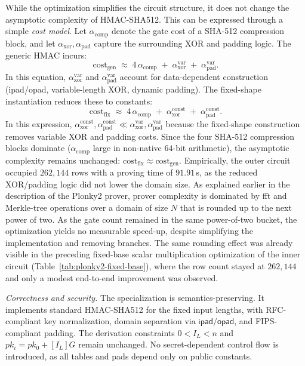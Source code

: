 While the optimization simplifies the circuit structure, it does not change the asymptotic complexity of HMAC-SHA512. This can be expressed through a simple \emph{cost model}. Let $\alpha_{\mathrm{comp}}$ denote the gate cost of a SHA-512 compression block, and let $\alpha_{\mathrm{xor}}, \alpha_{\mathrm{pad}}$ capture the surrounding XOR and padding logic. The generic HMAC incurs:
\[
\mathrm{cost}_{\mathrm{gen}} \;\approx\; 4\,\alpha_{\mathrm{comp}} \;+\; \alpha_{\mathrm{xor}}^{\mathrm{var}} \;+\; \alpha_{\mathrm{pad}}^{\mathrm{var}}.
\]
In this equation, $\alpha_{\mathrm{xor}}^{\mathrm{var}}$ and $\alpha_{\mathrm{pad}}^{\mathrm{var}}$ account for data-dependent construction (ipad/opad, variable-length XOR, dynamic padding). The fixed-shape instantiation reduces these to constants:
\[
\mathrm{cost}_{\mathrm{fix}} \;\approx\; 4\,\alpha_{\mathrm{comp}} \;+\; \alpha_{\mathrm{xor}}^{\mathrm{const}} \;+\; \alpha_{\mathrm{pad}}^{\mathrm{const}}.
\]
In this expression, $\alpha_{\mathrm{xor}}^{\mathrm{const}},\alpha_{\mathrm{pad}}^{\mathrm{const}} \ll 
\alpha_{\mathrm{xor}}^{\mathrm{var}},\alpha_{\mathrm{pad}}^{\mathrm{var}}$ because the fixed-shape construction removes variable XOR and padding costs. Since the four SHA-512 compression blocks dominate ($\alpha_{\mathrm{comp}}$ large in non-native $64$-bit arithmetic), the asymptotic complexity remains unchanged: $\mathrm{cost}_{\mathrm{fix}}\approx \mathrm{cost}_{\mathrm{gen}}$. Empirically, the outer circuit occupied $262{,}144$ rows with a proving time of $91.91$\,s, as the reduced XOR/padding logic did not lower the domain size. As explained earlier in the description of the Plonky2 prover, prover complexity is dominated by \acrshort{fft} and Merkle-tree operations over a domain of size $N$ that is rounded up to the next power of two. As the gate count remained in the same power-of-two bucket, the optimization yields no measurable speed-up, despite simplifying the implementation and removing branches. The same rounding effect was already visible in the preceding fixed-base scalar multiplication optimization of the inner circuit (Table~\ref{tab:plonky2-fixed-base}), where the row count stayed at $262{,}144$ and only a modest end-to-end improvement was observed.

\medskip
\noindent\emph{Correctness and security.}
The specialization is semantics-preserving. It implements standard HMAC-SHA512 for the fixed input lengths, with RFC-compliant key normalization, domain separation via $\mathsf{ipad}/\mathsf{opad}$, and FIPS-compliant padding. The derivation constraints $0<I_L<n$ and $pk_i = pk_0 + [I_L]G$ remain unchanged. No secret-dependent control flow is introduced, as all tables and pads depend only on public constants.


